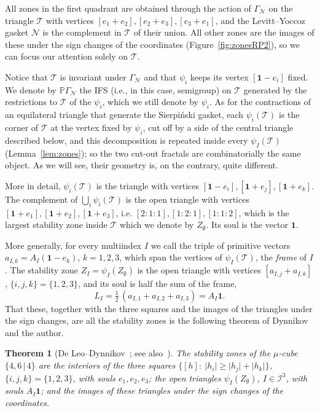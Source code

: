 \documentclass[11pt]{amsart}
\newtheorem{lettertheorem}{Theorem}%
\theoremstyle{definition}
\theoremstyle{remark}
\newcommand{\one}{\mathbf 1}
\newcommand{\cN}{\mathcal N}
\newcommand{\cI}{\mathcal I}
\newcommand{\cT}{\mathcal T}
\newcommand{\GN}{\Gamma_{\mathcal N}}
\newcommand{\PGN}{{\mathbb P}\Gamma_{\mathcal N}}
\newcommand{\abs}[1]{\lvert #1\rvert}
\begin{document}
All zones in the first quadrant are obtained through the action of $\GN$ on the triangle $\cT$ with vertices $[e_1+e_2], [e_2+e_3], [e_3+e_1]$, and the Levitt--Yoccoz gasket $\cN$ is the complement in $\cT$ of their union.
All other zones are the images of these under the sign changes of the coordinates (Figure~\ref{fig:zonesRP2}), so we can focus our attention solely on $\cT$.

Notice that $\cT$ is invariant under $\GN$ and that $\psi_i$ keeps its vertex $[\one-e_i]$ fixed.
We denote by $\PGN$ the IFS (i.e., in this case, semigroup) on $\cT$ generated by the restrictions to $\cT$ of the $\psi_i$, which we still denote by $\psi_i$.
As for the contractions of an equilateral triangle that generate the Sierpi\'nski gasket, each $\psi_i(\cT)$ is the corner of $\cT$ at the vertex fixed by $\psi_i$, cut off by a side of the central triangle described below, and this decomposition is repeated inside every $\psi_I(\cT)$ (Lemma~\ref{lem:zones}); so the two cut-out fractals are combinatorially the same object.
As we will see, their geometry is, on the contrary, quite different.

More in detail, $\psi_i(\mathcal T)$ is the triangle with vertices $[\mathbf 1-e_i],[\mathbf 1+e_j],[\mathbf 1+e_k]$. 
The complement of $\bigcup_i\psi_i(\mathcal T)$ is the open triangle with vertices $[\mathbf 1+e_1],[\mathbf 1+e_2],[\mathbf 1+e_3]$, i.e. $[2:1:1],[1:2:1],[1:1:2]$, which is the largest stability zone inside $\cT$ which we denote by $Z_\emptyset$.
Its soul is the vector $\one$.

More generally, for every multiindex $I$ we call the triple of primitive
vectors $a_{I,k}=A_I(\one-e_k)$, $k=1,2,3$, which span the vertices of $\psi_I(\mathcal T)$, the
\emph{frame} of $I$. 
The stability zone $Z_I=\psi_I(Z_\emptyset)$ is the open triangle with vertices $[a_{I,j}+a_{I,k}]$,
$\{i,j,k\}=\{1,2,3\}$, and its soul is half the sum of the frame,
\[
  L_I=\tfrac12\,(a_{I,1}+a_{I,2}+a_{I,3})=A_I\one .
\]
That these, together with the three squares and the images of the triangles under the sign changes, are all the stability zones is the following theorem of Dynnikov and the author.

\begin{lettertheorem}[De Leo--Dynnikov~{\cite[Thm.~1]{DD09}}; see also~\cite{DD07}]\label{thm:DD}
The stability zones of the $\mu$-cube $\{4,6\,|\,4\}$ are the interiors of the three squares $\{[h]:\ \abs{h_i}\ge\abs{h_j}+\abs{h_k}\}$, $\{i,j,k\}=\{1,2,3\}$, with souls $e_1,e_2,e_3$; the open triangles $\psi_I(Z_\emptyset)$, $I\in\cI^3$, with souls $A_I\one$; and the images of these triangles under the sign changes of the coordinates.
\end{lettertheorem}
\end{document}
